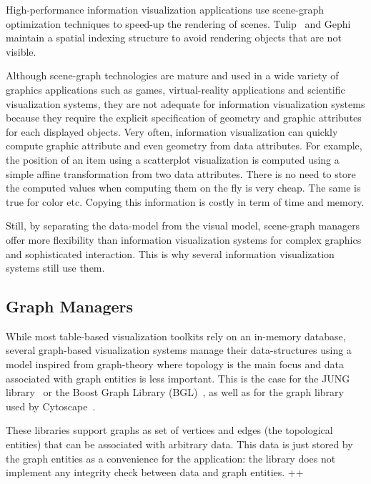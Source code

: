 High-performance information visualization applications use
scene-graph optimization techniques to speed-up the rendering of
scenes.  Tulip~\cite{Tulip} and Gephi~\cite{Gephi} maintain a spatial
indexing structure to avoid rendering objects that are not visible.

Although scene-graph technologies are mature and used in a wide
variety of graphics applications such as games, virtual-reality
applications and scientific visualization systems, they are not
adequate for information visualization systems because they require
the explicit specification of geometry and graphic attributes for each
displayed objects.  Very often, information visualization can quickly
compute graphic attribute and even geometry from data attributes.  For
example, the position of an item using a scatterplot visualization is
computed using a simple affine transformation from two data
attributes.  There is no need to store the computed values when
computing them on the fly is very cheap.  The same is true for color
etc.  Copying this information is costly in term of time and memory.

Still, by separating the data-model from the visual model, scene-graph
managers offer more flexibility than information visualization systems
for complex graphics and sophisticated interaction.  This is why
several information visualization systems still use them.


\subsection{Graph Managers}


While most table-based visualization toolkits rely on an in-memory
database, several graph-based visualization systems manage their
data-structures using a model inspired from graph-theory where
topology is the main focus and data associated with graph entities is
less important.  This is the case for the JUNG library~\cite{jung2003}
or the Boost Graph Library (BGL)~\cite{BGL}, as well as for the graph
library used by Cytoscape~\cite{Cytoscape}.

These libraries support graphs as set of vertices and edges (the
topological entities) that can be associated with arbitrary data.
This data is just stored by the graph entities as a convenience for
the application: the library does not implement any integrity check
between data and graph entities. ++


